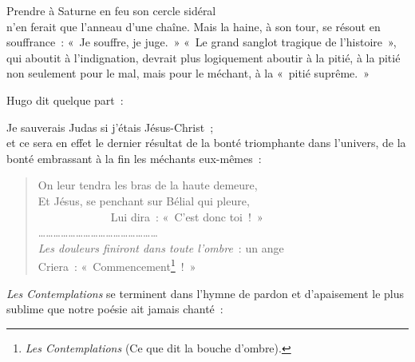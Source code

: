 \documentclass[french,twoside]{book} %
\begin{document}
Prendre à Saturne en feu son cercle sidéral\\

\noindent n’en ferait que l’anneau d’une chaîne. Mais la haine, à son tour, se résout en souffrance : « Je souffre, je juge. » « Le grand sanglot tragique de l’histoire », qui aboutit à l’indignation, devrait plus logiquement aboutir à la pitié, à la pitié non seulement pour le mal, mais pour le méchant, à la « pitié suprême. »\par
Hugo dit quelque part :\par

Je sauverais Judas si j’étais Jésus-Christ ;\\

\noindent et ce sera en effet le dernier résultat de la bonté triomphante dans l’univers, de la bonté embrassant à la fin les méchants eux-mêmes :\par


\begin{verse}
On leur tendra les bras de la haute demeure,\\
Et Jésus, se penchant sur Bélial qui pleure,\\
             Lui dira : « C’est donc toi ! »\\
…………………………………………\\
\emph{Les douleurs finiront dans toute l’ombre} : un ange\\
Criera : « Commencement\footnote{\emph{Les Contemplations} (Ce que dit la bouche d’ombre).} ! »\\
\end{verse}

\noindent \emph{Les Contemplations} se terminent dans l’hymne de pardon et d’apaisement le plus sublime que notre poésie ait jamais chanté :\par
\end{document}
